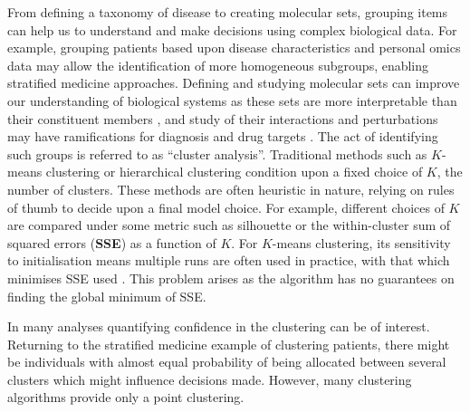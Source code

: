 \documentclass{article}
\begin{document}
From defining a taxonomy of disease to creating molecular sets, grouping items can help us to understand and make decisions using complex biological data. For example, grouping patients based upon disease characteristics and personal omics data may allow the identification of more homogeneous subgroups, enabling stratified medicine approaches. Defining and studying molecular sets can improve our understanding of biological systems as these sets are more interpretable than their constituent members \citep{hejblum2015time}, and study of their interactions and perturbations may have ramifications for diagnosis and drug targets \citep{bai2013strategic, emmert2014gene}. 
The act of identifying such groups is referred to as “cluster analysis”. Traditional methods such as $K$-means clustering \citep{lloyd1982least, forgy1965cluster} or hierarchical clustering condition upon a fixed choice of $K$, the number of clusters.  These methods are often heuristic in nature, relying on rules of thumb to decide upon a final model choice. For example, different choices of $K$ are compared under some metric such as silhouette or the within-cluster sum of squared errors (\textbf{SSE}) as a function of $K$. For $K$-means clustering, its sensitivity to initialisation means multiple runs are often used in practice, with that which minimises SSE used \citep{arthur2006k}. This problem arises as the algorithm has no guarantees on finding the global minimum of SSE.

In many analyses
quantifying confidence in the clustering can be of interest. Returning to the stratified medicine example of clustering patients, there might be individuals with almost equal probability of being allocated between several clusters which might influence decisions made.
However, many clustering algorithms provide only a point clustering.
\end{document}
